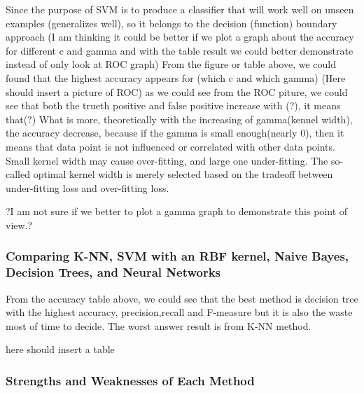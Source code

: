 \documentclass[]{article}
\begin{document}
Since the purpose of SVM is to produce a classifier that will work well on unseen examples (generalizes well), so it belongs to the decision (function) boundary approach 
(I am thinking it could be better if we plot a graph about the accuracy for different c and gamma and with the table result we could better demonstrate instead of only look at ROC graph) 
From the figure or table above, we could found that the highest accuracy appears for (which c and which gamma)
(Here should insert a picture of ROC)
as we could see from the ROC piture, we could see that both the trueth positive and false positive increase with (?), it means that(?)
What is more, theoretically with the increasing of gamma(kennel width), the accuracy decrease, because if the gamma is small enough(nearly 0), then it means that data point is not influenced or correlated with other data points. Small kernel width may cause over-fitting, and large one under-fitting. The so-called optimal kernel width is merely selected based on the tradeoff between under-fitting loss and over-fitting loss.

?I am not sure if we better to plot a gamma graph to demonstrate this point of view.?


\subsubsection{Comparing K-NN, SVM with an RBF kernel, Naive Bayes, Decision Trees, and Neural Networks }



From the accuracy table above, we could see that the best method is decision tree with the highest accuracy, precision,recall and F-measure but it is also the waste most of time to decide. The worst answer result is from K-NN method.


here should insert a table


\subsubsection{Strengths and Weaknesses of Each Method}
\end{document}
